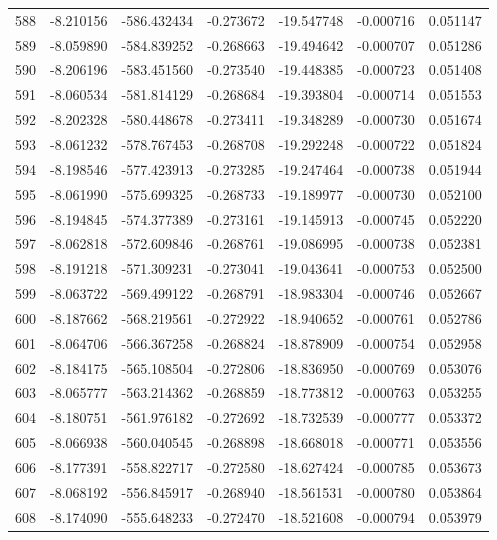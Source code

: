 \begin{tabular}{rrrrrrr}
 588 &  -8.210156 & -586.432434 & -0.273672 & -19.547748 &  -0.000716 &  0.051147 \\
 589 &  -8.059890 & -584.839252 & -0.268663 & -19.494642 &  -0.000707 &  0.051286 \\
 590 &  -8.206196 & -583.451560 & -0.273540 & -19.448385 &  -0.000723 &  0.051408 \\
 591 &  -8.060534 & -581.814129 & -0.268684 & -19.393804 &  -0.000714 &  0.051553 \\
 592 &  -8.202328 & -580.448678 & -0.273411 & -19.348289 &  -0.000730 &  0.051674 \\
 593 &  -8.061232 & -578.767453 & -0.268708 & -19.292248 &  -0.000722 &  0.051824 \\
 594 &  -8.198546 & -577.423913 & -0.273285 & -19.247464 &  -0.000738 &  0.051944 \\
 595 &  -8.061990 & -575.699325 & -0.268733 & -19.189977 &  -0.000730 &  0.052100 \\
 596 &  -8.194845 & -574.377389 & -0.273161 & -19.145913 &  -0.000745 &  0.052220 \\
 597 &  -8.062818 & -572.609846 & -0.268761 & -19.086995 &  -0.000738 &  0.052381 \\
 598 &  -8.191218 & -571.309231 & -0.273041 & -19.043641 &  -0.000753 &  0.052500 \\
 599 &  -8.063722 & -569.499122 & -0.268791 & -18.983304 &  -0.000746 &  0.052667 \\
 600 &  -8.187662 & -568.219561 & -0.272922 & -18.940652 &  -0.000761 &  0.052786 \\
 601 &  -8.064706 & -566.367258 & -0.268824 & -18.878909 &  -0.000754 &  0.052958 \\
 602 &  -8.184175 & -565.108504 & -0.272806 & -18.836950 &  -0.000769 &  0.053076 \\
 603 &  -8.065777 & -563.214362 & -0.268859 & -18.773812 &  -0.000763 &  0.053255 \\
 604 &  -8.180751 & -561.976182 & -0.272692 & -18.732539 &  -0.000777 &  0.053372 \\
 605 &  -8.066938 & -560.040545 & -0.268898 & -18.668018 &  -0.000771 &  0.053556 \\
 606 &  -8.177391 & -558.822717 & -0.272580 & -18.627424 &  -0.000785 &  0.053673 \\
 607 &  -8.068192 & -556.845917 & -0.268940 & -18.561531 &  -0.000780 &  0.053864 \\
 608 &  -8.174090 & -555.648233 & -0.272470 & -18.521608 &  -0.000794 &  0.053979 \\

\end{tabular}
